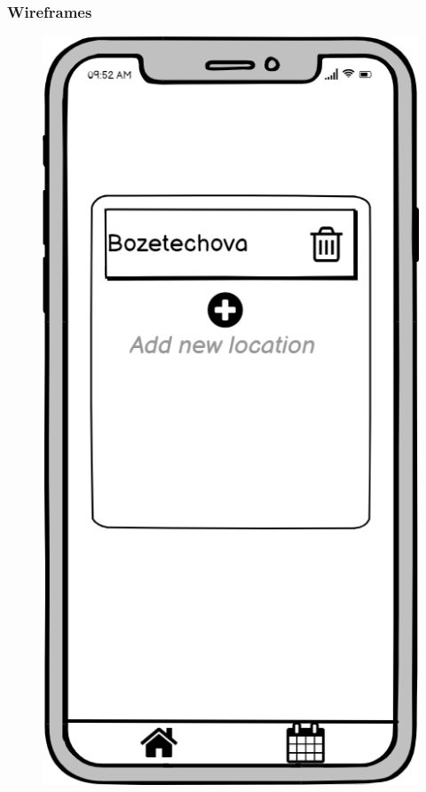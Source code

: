\documentclass[10pt,xcolor=pdflatex,hyperref={unicode}]{beamer}
\begin{document}
\begin{frame}\frametitle{Wireframes}
    \begin{figure}
        \centering
        \begin{minipage}{0.3\textwidth}
            \includegraphics[width=0.25\paperwidth]{img/wireframe1.png}
        \end{minipage}
        \hfill
        \begin{minipage}{0.3\textwidth}

\end{minipage}
\end{figure}
\end{frame}
\end{document}
